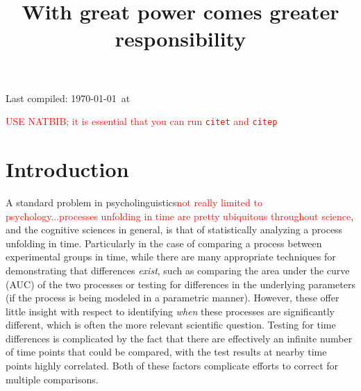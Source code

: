 \documentclass{article}
\title{With great power comes greater responsibility}
\date{}
\newcommand{\xt}{\texttt}
\providecommand{\pb}[1]{\textcolor{red}{#1}}
\begin{document}

\maketitle

Last compiled: \today \  at \currenttime

\pb{USE NATBIB; it is essential that you can run \xt{citet} and \xt{citep}}

%


\section{Introduction}

A standard problem in psycholinguistics\pb{not really limited to psychology...processes unfolding in time are pretty ubiquitous throughout science}, and the cognitive sciences in general, is that of statistically analyzing a process unfolding in time. Particularly in the case of comparing a process between experimental groups in time, while there are many appropriate techniques for demonstrating that differences \textit{exist}, such as comparing the area under the curve (AUC) of the two processes or testing for differences in the underlying parameters (if the process is being modeled in a parametric manner). However, these offer little insight with respect to identifying \textit{when} these processes are significantly different, which is often the more relevant scientific question. Testing for time differences is complicated by the fact that there are effectively an infinite number of time points that could be compared, with the test results at nearby time points highly correlated. Both of these factors complicate efforts to correct for multiple comparisons.
\end{document}
